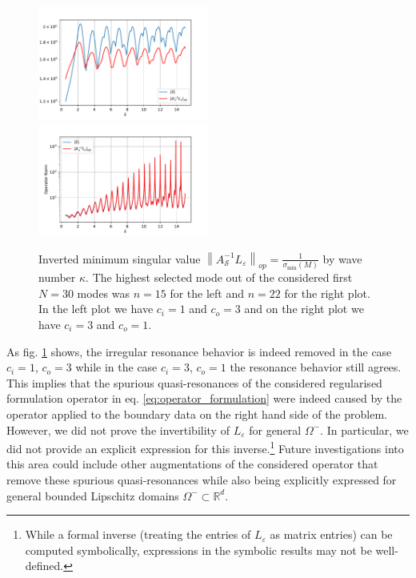 \documentclass[12pt,journal,compsoc, onecolumn]{IEEEtran}
\begin{document}
\begin{figure}
    \includegraphics[width=0.5\textwidth]{InvertedMinimumSingularValuec_i1.0c_o3.0N_30eta1.0plotRangeStart_0,5plotRangeEnd_15shiftFirstValue_FalseremoveResonances_Trueindexrange_-15,0-0,0.pdf}
    \includegraphics[width=0.5\textwidth]{InvertedMinimumSingularValuec_i3,0c_o1,0N_30eta1,0plotRangeStart_0,5plotRangeEnd_15shiftFirstValue_FalseremoveResonances_Trueindexrange_-22,0-0,0.pdf}
    \caption{Inverted minimum singular value $\left\|A_{\mathcal{S}}^{-1}L_\varepsilon\right\|_{o p} =\frac{1}{\sigma_{\min }(M)}$ by wave number $\kappa$. The highest selected mode out of the considered first $N = 30$ modes was $n = 15$ for the left and $n =22$ for the right plot.
    In the left plot we have $c_i = 1$ and $c_o = 3$
    and on the right plot we have $c_i = 3$ and $c_o = 1$. }
   \label{fig:regularised_results}
\end{figure}
\noindent
As fig. \ref{fig:regularised_results} shows, the irregular resonance  behavior is indeed removed in the case $c_i = 1$, $c_o = 3$ while in the case $c_i = 3$, $c_o = 1$ the resonance behavior still agrees. This implies that the spurious quasi-resonances of the considered regularised formulation operator in eq. \ref{eq:operator_formulation} were indeed caused by the operator applied to the boundary data on the right hand side of the problem.
However, we did not prove the invertibility of $L_\varepsilon$ for general $\Omega^-$. In particular, we did not provide an explicit expression for this inverse.\footnote{While a formal inverse (treating the entries of $L_\varepsilon$ as matrix entries) can be computed symbolically, expressions in the symbolic results may not be well-defined.} Future investigations into this area could include other augmentations of the considered operator that remove these spurious quasi-resonances while also being explicitly expressed for general bounded Lipschitz domains $\Omega^- \subset \mathbb{R}^d$. 
\end{document}
